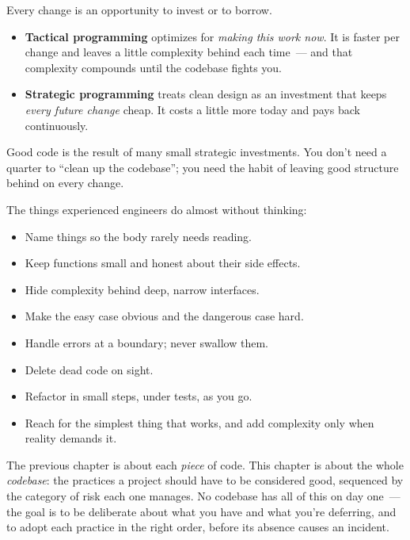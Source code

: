 Every change is an opportunity to invest or to borrow.

\begin{itemize}
\tightlist
\item
  \textbf{Tactical programming} optimizes for \emph{making this work now}. It is faster per change and leaves a
  little complexity behind each time~--- and that complexity compounds until the codebase fights you.
\item
  \textbf{Strategic programming} treats clean design as an investment that keeps \emph{every future change}
  cheap. It costs a little more today and pays back continuously.
\end{itemize}

\noindent{}Good code is the result of many small strategic investments. You don't need a quarter to ``clean up
the codebase''; you need the habit of leaving good structure behind on every change.

\label{writing-good-code:a-practitioners-habits}

The things experienced engineers do almost without thinking:

\begin{itemize}
\tightlist
\item
  Name things so the body rarely needs reading.
\item
  Keep functions small and honest about their side effects.
\item
  Hide complexity behind deep, narrow interfaces.
\item
  Make the easy case obvious and the dangerous case hard.
\item
  Handle errors at a boundary; never swallow them.
\item
  Delete dead code on sight.
\item
  Refactor in small steps, under tests, as you go.
\item
  Reach for the simplest thing that works, and add complexity only when reality demands it.
\end{itemize}

\label{ch:writing-good-code-2}

\chapterrule

The previous chapter is about each \emph{piece} of code. This chapter is about the whole \emph{codebase}: the practices a
project should have to be considered good, sequenced by the category of risk each one manages. No
codebase has all of this on day one~--- the goal is to be deliberate about what you have and what
you're deferring, and to adopt each practice in the right order, before its absence causes an
incident.

